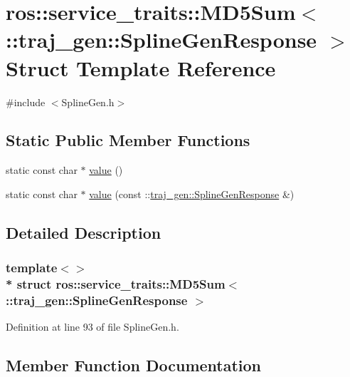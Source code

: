 \hypertarget{structros_1_1service__traits_1_1_m_d5_sum_3_01_1_1traj__gen_1_1_spline_gen_response_01_4}{}\section{ros\+:\+:service\+\_\+traits\+:\+:M\+D5\+Sum$<$ \+:\+:traj\+\_\+gen\+:\+:Spline\+Gen\+Response $>$ Struct Template Reference}
\label{structros_1_1service__traits_1_1_m_d5_sum_3_01_1_1traj__gen_1_1_spline_gen_response_01_4}


{\ttfamily \#include $<$Spline\+Gen.\+h$>$}

\subsection*{Static Public Member Functions}
\begin{DoxyCompactItemize}
\item 
static const char $\ast$ \hyperlink{structros_1_1service__traits_1_1_m_d5_sum_3_01_1_1traj__gen_1_1_spline_gen_response_01_4_ad5d12c20d51932c854152b1a8552c1c5}{value} ()
\item 
static const char $\ast$ \hyperlink{structros_1_1service__traits_1_1_m_d5_sum_3_01_1_1traj__gen_1_1_spline_gen_response_01_4_aef319a2b94bfae3844d803691fbe9dfb}{value} (const \+::\hyperlink{namespacetraj__gen_a96b15a7eb1a4a1209fba2e9d75acb7a4}{traj\+\_\+gen\+::\+Spline\+Gen\+Response} \&)
\end{DoxyCompactItemize}


\subsection{Detailed Description}
\subsubsection*{template$<$$>$\\*
struct ros\+::service\+\_\+traits\+::\+M\+D5\+Sum$<$ \+::traj\+\_\+gen\+::\+Spline\+Gen\+Response $>$}



Definition at line 93 of file Spline\+Gen.\+h.



\subsection{Member Function Documentation}
